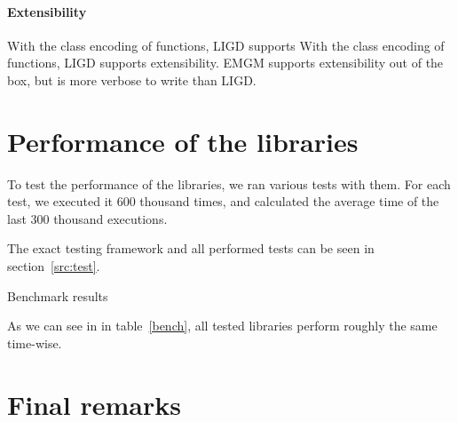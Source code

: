 \paragraph{Extensibility}
With the class encoding of functions, LIGD supports
With the class encoding of functions, LIGD supports
extensibility. EMGM supports extensibility out of the box, but is more verbose
to write than LIGD. 

\section{Performance of the libraries}

To test the performance of the libraries, we ran various tests with them. For
each test, we executed it 600 thousand times, and calculated the average
time of the last 300 thousand executions.

The exact testing framework and all performed tests can be seen in
section~\ref{src:test}.

\begin{table}[ht]

\caption{Benchmark results}
\label{bench}
\end{table}

As we can see in in table~\ref{bench}, all tested libraries perform roughly
the same time-wise.

\section{Final remarks}
